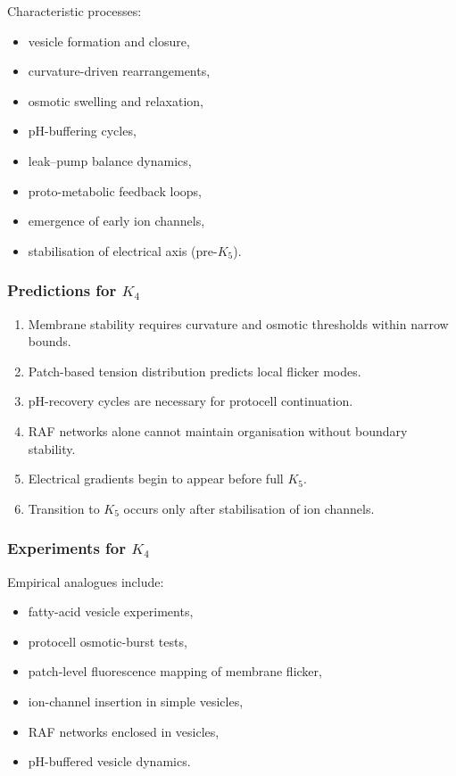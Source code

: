 Characteristic processes:
\begin{itemize}
    \item vesicle formation and closure,
    \item curvature-driven rearrangements,
    \item osmotic swelling and relaxation,
    \item pH-buffering cycles,
    \item leak–pump balance dynamics,
    \item proto-metabolic feedback loops,
    \item emergence of early ion channels,
    \item stabilisation of electrical axis (pre-$K_5$).
\end{itemize}

\subsubsection{Predictions for \texorpdfstring{$K_4$}{K_4}}

\begin{enumerate}
    \item Membrane stability requires curvature and osmotic thresholds
          within narrow bounds.
    \item Patch-based tension distribution predicts local flicker modes.
    \item pH-recovery cycles are necessary for protocell continuation.
    \item RAF networks alone cannot maintain organisation without
          boundary stability.
    \item Electrical gradients begin to appear before full $K_5$.
    \item Transition to $K_5$ occurs only after stabilisation of ion
          channels.
\end{enumerate}

\subsubsection{Experiments for \texorpdfstring{$K_4$}{K_4}}

Empirical analogues include:
\begin{itemize}
    \item fatty-acid vesicle experiments,
    \item protocell osmotic-burst tests,
    \item patch-level fluorescence mapping of membrane flicker,
    \item ion-channel insertion in simple vesicles,
    \item RAF networks enclosed in vesicles,
    \item pH-buffered vesicle dynamics.
\end{itemize}

